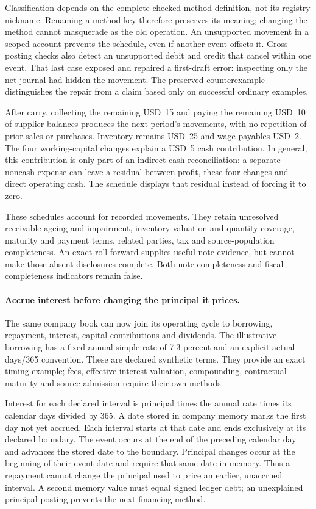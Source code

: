 Classification depends on the complete checked method definition, not its registry
nickname. Renaming a method key therefore preserves its meaning; changing the
method cannot masquerade as the old operation. An unsupported movement in a scoped
account prevents the schedule, even if another event offsets it. Gross posting
checks also detect an unsupported debit and credit that cancel within one event.
That last case exposed and repaired a first-draft error: inspecting only the net
journal had hidden the movement. The preserved counterexample distinguishes the
repair from a claim based only on successful ordinary examples.

After carry, collecting the remaining USD~15 and paying the remaining USD~10 of
supplier balances produces the next period's movements, with no repetition of
prior sales or purchases. Inventory remains USD~25 and wage payables USD~2.
The four working-capital changes explain a USD~5 cash contribution. In general,
this contribution is only part of an indirect cash reconciliation: a separate
noncash expense can leave a residual between profit, these four changes and direct
operating cash. The schedule displays that residual instead of forcing it to zero.

These schedules account for recorded movements. They retain unresolved receivable
ageing and impairment, inventory valuation and quantity coverage, maturity and
payment terms, related parties, tax and source-population completeness. An exact
roll-forward supplies useful note evidence, but cannot make those absent disclosures
complete. Both note-completeness and fiscal-completeness indicators remain false.


\paragraph{Accrue interest before changing the principal it prices.}
The same company book can now join its operating cycle to borrowing, repayment,
interest, capital contributions and dividends. The illustrative borrowing has a
fixed annual simple rate of 7.3 percent and an explicit actual-days/365 convention.
These are declared synthetic terms. They provide an exact timing example; fees,
effective-interest valuation, compounding, contractual maturity and source
admission require their own methods.

Interest for each declared interval is principal times the annual rate times its
calendar days divided by 365. A date stored in company memory marks the first day
not yet accrued. Each interval starts at that date and ends exclusively at its
declared boundary. The event occurs at the end of the preceding calendar day and
advances the stored date to the boundary. Principal changes occur at the beginning
of their event date and require that same date in memory. Thus a repayment cannot
change the principal used to price an earlier, unaccrued interval. A second memory
value must equal signed ledger debt; an unexplained principal posting prevents the
next financing method.

